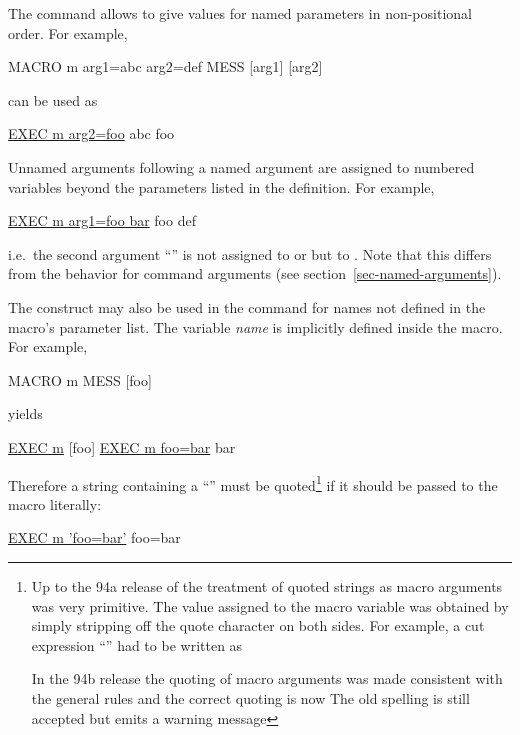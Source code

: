 The  command allows to give values for named parameters in
non-positional order.
For example,
\begin{XMP}
MACRO m arg1=abc arg2=def
MESS [arg1] [arg2]
\end{XMP}
can be used as
\begin{XMP}
\PROMPT{} \underline{EXEC m arg2=foo}
 abc foo
\end{XMP}
\vspace{-.5\baselineskip}

Unnamed  arguments following a named argument are assigned
to numbered variables beyond the parameters listed in the 
definition.
For example,
\begin{XMP}
\PROMPT{} \underline{EXEC m arg1=foo bar}
 foo def
\end{XMP}
i.e.\ the second argument ``'' is not assigned to \Lit{[arg2]}
or \Lit{[2]} but to \Lit{[3]}.
Note that this differs from the behavior for command arguments (see
section~\ref{sec-named-arguments}). 

The construct  may also be used in
the  command for names not defined in the macro's parameter list.
The variable \textsl{name} is implicitly defined inside the macro.
For example,
\begin{XMP}
MACRO m
MESS [foo]
\end{XMP}
yields
\begin{XMP}
\PROMPT{} \underline{EXEC m}
 [foo]
\PROMPT{} \underline{EXEC m foo=bar}
 bar
\end{XMP}
Therefore a string containing a ``\Lit{=}'' must be
quoted\footnote{
Up to the 94a release of \KUIP{} the treatment of quoted strings as
macro arguments was very primitive.
The value assigned to the macro variable was obtained by simply
stripping off the quote character on both sides.
For example, a cut expression ``'' had to be
written as

In the 94b release the quoting of macro arguments was made consistent
with the general rules and the correct quoting is now
The old spelling is still accepted but emits a warning message
}
if it should be
passed to the macro literally:
\begin{XMP}
\PROMPT{} \underline{EXEC m 'foo=bar'}
 foo=bar
\end{XMP}
\vspace{-.5\baselineskip}


